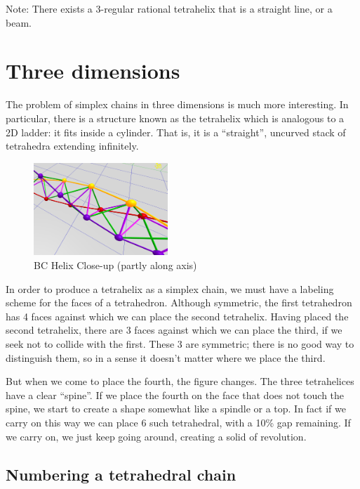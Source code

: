 \documentclass[11pt]{article}
\begin{document}
Note: There exists a 3-regular rational tetrahelix that is a straight line, or a beam.


\section{Three dimensions}

The problem of simplex chains in three dimensions is much more interesting. In particular, there is a structure known as the
tetrahelix which is analogous to a 2D ladder: it fits inside a cylinder. That is, it is a ``straight'', uncurved stack
of tetrahedra extending infinitely.


\begin{figure}
  \centering
     \includegraphics[width=0.45\textwidth]{figures/BCHelixCloseUp.png}
     \caption{BC Helix Close-up (partly along axis)}
  \label{fig:closeup}     
\end{figure}



In order to produce a tetrahelix as a simplex chain, we must have a labeling scheme for the faces of a tetrahedron.
Although symmetric, the first tetrahedron has 4 faces against which we can place the second tetrahelix.
Having placed the second tetrahelix, there are 3 faces against which we can place the third, if we
seek not to collide with the first. These 3 are symmetric; there is no good way to distinguish them,
so in a sense it doesn't matter where we place the third.

But when we come to place the fourth, the figure changes. The three tetrahelices have a clear ``spine''. If we
place the fourth on the face that does not touch the spine, we start to create a shape somewhat like a spindle or a top.
In fact if we carry on this way we can place 6 such tetrahedral, with a 10\% gap remaining. If we carry on, we just keep
going around, creating a solid of revolution.

\subsection{Numbering a tetrahedral chain}
\end{document}
